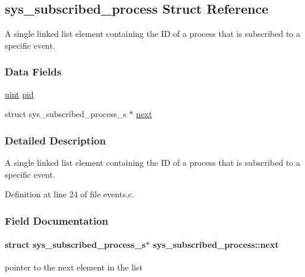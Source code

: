 \hypertarget{structsys__subscribed__process}{}\subsection{sys\+\_\+subscribed\+\_\+process Struct Reference}
\label{structsys__subscribed__process}


A single linked list element containing the I\+D of a process that is subscribed to a specific event.  


\subsubsection*{Data Fields}
\begin{DoxyCompactItemize}
\item 
\hyperlink{definitions_8h_a1445ebbbf93d62972255ec5e89a5ab01}{uint} \hyperlink{structsys__subscribed__process_a921208fb1aaecfa56282941d9781a173}{pid}
\item 
struct sys\+\_\+subscribed\+\_\+process\+\_\+s $\ast$ \hyperlink{structsys__subscribed__process_a372487adeea2a9ec98f6245c2b069e63}{next}
\end{DoxyCompactItemize}


\subsubsection{Detailed Description}
A single linked list element containing the I\+D of a process that is subscribed to a specific event. 

Definition at line 24 of file events.\+c.



\subsubsection{Field Documentation}
\hypertarget{structsys__subscribed__process_a372487adeea2a9ec98f6245c2b069e63}{}
\paragraph[{next}]{\setlength{\rightskip}{0pt plus 5cm}struct sys\+\_\+subscribed\+\_\+process\+\_\+s$\ast$ sys\+\_\+subscribed\+\_\+process\+::next}\label{structsys__subscribed__process_a372487adeea2a9ec98f6245c2b069e63}
pointer to the next element in the list 

